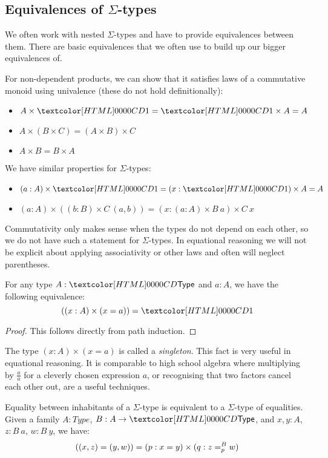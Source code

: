 \subsection{Equivalences of $\Sigma$-types}

We often work with nested $\Sigma$-types and have to provide
equivalences between them. There are basic equivalences that we often
use to build up our bigger equivalences of.

For non-dependent products, we can show that it satisfies laws of a
commutative monoid using univalence (these do not hold
definitionally):
\begin{itemize}
\item $A \times \unitty = \unitty \times A = A$
\item $A \times (B \times C) = (A \times B) \times C$
\item $A \times B = B \times A$
\end{itemize}
We have similar properties for $\Sigma$-types:
\begin{itemize}
\item $(a : A) \times \unitty = (x : \unitty) \times A = A$
\item $(a : A) \times ((b : B) \times C\ (a , b)) = (x : (a : A) \times B\ a) \times C\ x$
\end{itemize}
Commutativity only makes sense when the types do not depend on
each other, so we do not have such a statement for $\Sigma$-types. In
equational reasoning we will not be explicit about applying
associativity or other laws and often will neglect parentheses.

\begin{proposition}
  For any type $A : \Type$ and $a : A$, we have the following
  equivalence:
  $$
  ((x : A) \times (x = a)) = \unitty
  $$
\end{proposition}

\begin{proof}
  This follows directly from path induction.
\end{proof}

The type $(x : A) \times (x = a)$ is called a \emph{singleton}. This
fact is very useful in equational reasoning. It is comparable to high
school algebra where multiplying by $\frac{a}{a}$ for a cleverly
chosen expression $a$, or recognising that two factors cancel
each other out, are a useful techniques.

\begin{proposition}
  Equality between inhabitants of a $\Sigma$-type is equivalent to a
  $\Sigma$-type of equalities. Given a family $A : Type$,
  $B : A \to \Type$, and $x , y : A$, $z : B\ a$, $w : B\ y$, we have:
  $$
  ((x , z) = (y , w)) = (p : x = y) \times (q : \pathover{B}{p}{z}{w})
  $$
\end{proposition}

